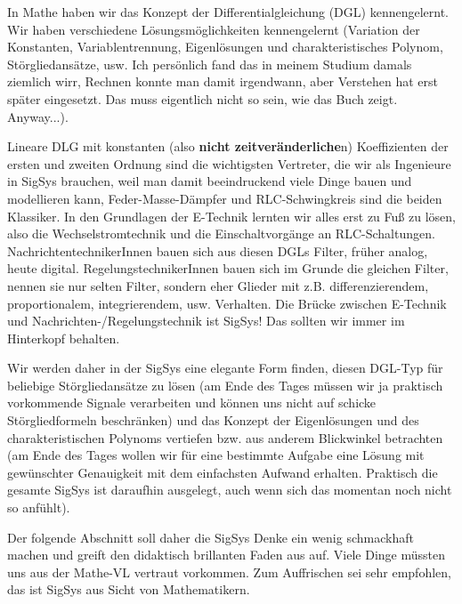 In Mathe haben wir das Konzept der Differentialgleichung (DGL) kennengelernt.
%
Wir haben verschiedene Lösungsmöglichkeiten kennengelernt (Variation
der Konstanten, Variablentrennung, Eigenlösungen und charakteristisches Polynom,
Störgliedansätze, usw. Ich persönlich fand das in meinem Studium damals
ziemlich wirr, Rechnen konnte man damit irgendwann, aber Verstehen hat erst
später eingesetzt. Das muss eigentlich nicht so sein, wie das Buch
\cite{Strang2014} zeigt.
Anyway...).

Lineare DLG mit konstanten (also \textbf{nicht zeitveränderliche}n) Koeffizienten der
ersten und zweiten Ordnung sind die wichtigsten Vertreter, die wir als Ingenieure
in SigSys brauchen, weil man damit beeindruckend viele Dinge bauen und modellieren
kann, Feder-Masse-Dämpfer und RLC-Schwingkreis sind die beiden Klassiker.
%
In den Grundlagen der E-Technik lernten wir alles erst zu Fuß zu lösen, also
die Wechselstromtechnik und die Einschaltvorgänge an RLC-Schaltungen.
%
NachrichtentechnikerInnen bauen sich aus diesen DGLs Filter, früher analog, heute digital.
%
RegelungstechnikerInnen bauen sich im Grunde die gleichen Filter, nennen sie nur
selten Filter, sondern eher Glieder mit z.B. differenzierendem, proportionalem,
integrierendem, usw. Verhalten.
%
Die Brücke zwischen E-Technik und Nachrichten-/Regelungstechnik ist SigSys!
Das sollten wir immer im Hinterkopf behalten.

Wir werden daher in der SigSys eine elegante Form finden,
diesen DGL-Typ für beliebige Störgliedansätze zu lösen (am Ende des Tages
müssen wir ja praktisch vorkommende Signale verarbeiten und können uns nicht
auf schicke Störgliedformeln beschränken)
und das Konzept der Eigenlösungen und des charakteristischen
Polynoms vertiefen bzw. aus anderem Blickwinkel betrachten (am Ende des Tages
wollen wir für eine bestimmte Aufgabe eine Lösung mit gewünschter Genauigkeit
mit dem einfachsten Aufwand erhalten. Praktisch die gesamte SigSys ist daraufhin
ausgelegt, auch wenn sich das momentan noch nicht so anfühlt).

Der folgende Abschnitt soll daher die SigSys Denke ein wenig schmackhaft machen und
greift den didaktisch brillanten Faden aus \cite{Strang2014} auf. Viele Dinge
müssten uns aus der Mathe-VL vertraut vorkommen.
%
Zum Auffrischen sei \cite{Burg2013} sehr empfohlen, das ist SigSys aus Sicht von
Mathematikern.
%
